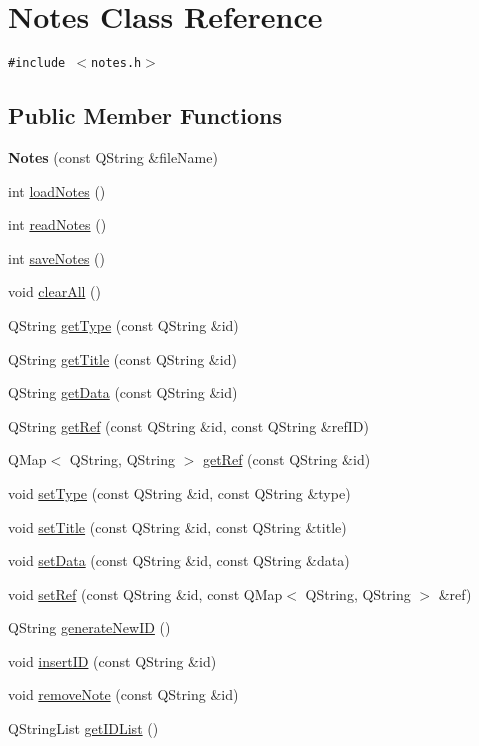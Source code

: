 \hypertarget{classNotes}{
\section{Notes Class Reference}
\label{classNotes}
}
{\tt \#include $<$notes.h$>$}

\subsection*{Public Member Functions}
\begin{CompactItemize}
\item 
\hypertarget{classNotes_04a24963382268eddd6ad09387fc0958}{
\textbf{Notes} (const QString \&fileName)}
\label{classNotes_04a24963382268eddd6ad09387fc0958}

\item 
int \hyperlink{classNotes_91273d4a534e6426adb63bef043b4dbc}{loadNotes} ()
\item 
int \hyperlink{classNotes_a47d6a7af0c2674fe6d3372280755d5b}{readNotes} ()
\item 
int \hyperlink{classNotes_f76c3652cd25371b7233eb84079b39a0}{saveNotes} ()
\item 
void \hyperlink{classNotes_9abdabc242dc6340e4b5157fb3620ee0}{clearAll} ()
\item 
QString \hyperlink{classNotes_8fe0144e2c4f5566f1ba03545dba94e4}{getType} (const QString \&id)
\item 
QString \hyperlink{classNotes_784bbf981f20f1ffc9a07c32d1f2ad2f}{getTitle} (const QString \&id)
\item 
QString \hyperlink{classNotes_3a60de9ba1c1fc3e1cd118ca50443f02}{getData} (const QString \&id)
\item 
QString \hyperlink{classNotes_e1fdbee2ecd121c81c7eb1c48404094d}{getRef} (const QString \&id, const QString \&refID)
\item 
QMap$<$ QString, QString $>$ \hyperlink{classNotes_2452989d91340c9158210421a5d16362}{getRef} (const QString \&id)
\item 
void \hyperlink{classNotes_2e471d6614087c21ad4265596387312c}{setType} (const QString \&id, const QString \&type)
\item 
void \hyperlink{classNotes_ce9ed14dfa9f9ca785070b70a06deec3}{setTitle} (const QString \&id, const QString \&title)
\item 
void \hyperlink{classNotes_176683f801c998ff85f667947c41c7d9}{setData} (const QString \&id, const QString \&data)
\item 
void \hyperlink{classNotes_d42175f40ec450badc4ed396229a3246}{setRef} (const QString \&id, const QMap$<$ QString, QString $>$ \&ref)
\item 
QString \hyperlink{classNotes_b554798a22ce20a2f7cb195c3b1904bd}{generateNewID} ()
\item 
void \hyperlink{classNotes_08ba874a751ba5fde4620ac5b5ff8037}{insertID} (const QString \&id)
\item 
void \hyperlink{classNotes_86b09275d829523b0eb42da6b008a580}{removeNote} (const QString \&id)
\item 
QStringList \hyperlink{classNotes_ee2eb5a4a6cf347e38351585de15c013}{getIDList} ()
\end{CompactItemize}


